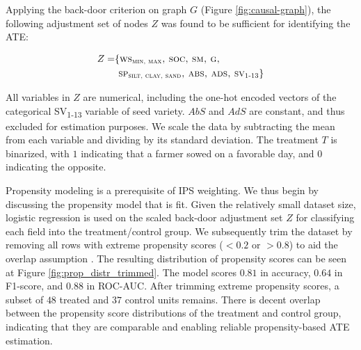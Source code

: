 \documentclass[letterpaper]{article} %
\begin{document}
Applying the back-door criterion on graph $G$ (Figure \ref{fig:causal-graph}), the following adjustment set of nodes $Z$ was found to be sufficient for identifying the ATE: 

\begin{equation}
\begin{aligned}
Z = & \{\textsc{ws\textsubscript{min, max}, soc, sm, g, } \\
    & \textsc{  sp\textsubscript{silt, clay, sand}, abs, ads, sv\textsubscript{1-13}} \}
\end{aligned}
\end{equation}

\noindent All variables in $Z$ are numerical, including the one-hot encoded vectors of the categorical \textsc{SV}\textsubscript{1-13} variable of seed variety. $AbS$ and $AdS$ are constant, and thus excluded for estimation purposes. We scale the data by subtracting the mean from each variable and dividing by its standard deviation. The treatment $T$ is binarized, with $1$ indicating that a farmer sowed on a favorable day, and $0$ indicating the opposite.

Propensity modeling is a prerequisite of IPS weighting. We thus begin by discussing the propensity model that is fit. Given the relatively small dataset size, 
logistic regression is used on the scaled back-door adjustment set $Z$ for classifying each field into the treatment/control group. We subsequently trim the dataset by removing all rows with extreme propensity scores ($<0.2$ or $>0.8$) to aid the overlap assumption 
\cite{imbens2015causal}. The resulting distribution of propensity scores can be seen at Figure \ref{fig:prop_distr_trimmed}. The model scores $0.81$ in accuracy, $0.64$ in F1-score, and $0.88$ in ROC-AUC.
After trimming extreme propensity scores, a subset of $48$ treated and $37$ control units remains. There is decent overlap between the propensity score distributions of the treatment and control group, indicating that they are comparable and enabling reliable propensity-based ATE estimation.
\end{document}
